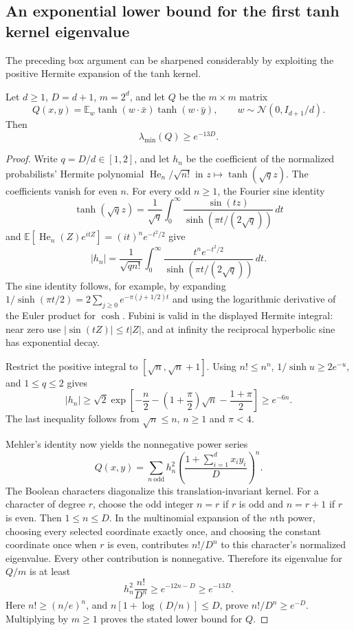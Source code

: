 \subsection{An exponential lower bound for the first tanh kernel eigenvalue}
\label{sec:critical-first-spectrum}

The preceding box argument can be sharpened considerably by exploiting
the positive Hermite expansion of the tanh kernel.

\begin{lemma}
\label{lem:first-tanh-spectrum}
Let $d\ge1$, $D=d+1$, $m=2^d$, and let $Q$ be the $m\times m$ matrix
\[
 Q(x,y)=\mathbb E_w\tanh(w\cdot\bar x)\tanh(w\cdot\bar y),
 \qquad w\sim\mathcal N(0,I_{d+1}/d).
\]
Then
\[
 \lambda_{\min}(Q)\ge e^{-13D}.
\]
\end{lemma}

\begin{proof}
Write $q=D/d\in[1,2]$, and let $h_n$ be the coefficient of the
normalized probabilists' Hermite polynomial $\operatorname{He}_n/\sqrt{n!}$
in $z\mapsto\tanh(\sqrt q z)$. The coefficients vanish for even $n$.
For every odd $n\ge1$, the Fourier sine identity
\[
 \tanh(\sqrt q z)=\frac1{\sqrt q}\int_0^\infty
       \frac{\sin(tz)}{\sinh(\pi t/(2\sqrt q))}\,dt
\]
and $\mathbb E[\operatorname{He}_n(Z)e^{itZ}]=(it)^ne^{-t^2/2}$ give
\[
 |h_n|=\frac1{\sqrt{q n!}}\int_0^\infty
       \frac{t^ne^{-t^2/2}}{\sinh(\pi t/(2\sqrt q))}\,dt.
\]
The sine identity follows, for example, by expanding
$1/\sinh(\pi t/2)=2\sum_{j\ge0}e^{-\pi(j+1/2)t}$ and using the
logarithmic derivative of the Euler product for $\cosh$.
Fubini is valid in the displayed Hermite integral: near zero use
$|\sin(tZ)|\le t|Z|$, and at infinity the reciprocal hyperbolic sine
has exponential decay.

Restrict the positive integral to $[\sqrt n,\sqrt n+1]$.
Using $n!\le n^n$, $1/\sinh u\ge2e^{-u}$, and $1\le q\le2$ gives
\[
 |h_n|\ge\sqrt2\exp\left[-\frac n2
               -\left(1+\frac\pi2\right)\sqrt n
               -\frac{1+\pi}{2}\right]\ge e^{-6n}.
\]
The last inequality follows from $\sqrt n\le n$, $n\ge1$ and $\pi<4$.

Mehler's identity now yields the nonnegative power series
\[
 Q(x,y)=\sum_{n\ \mathrm{odd}}h_n^2
       \left(\frac{1+\sum_{i=1}^d x_i y_i}{D}\right)^n.
\]
The Boolean characters diagonalize this translation-invariant kernel.
For a character of degree $r$, choose the odd integer $n=r$ if $r$
is odd and $n=r+1$ if $r$ is even. Then $1\le n\le D$.
In the multinomial expansion of the $n$th power, choosing every
selected coordinate exactly once, and choosing the constant coordinate
once when $r$ is even, contributes $n!/D^n$ to this character's
normalized eigenvalue. Every other contribution is nonnegative.
Therefore its eigenvalue for $Q/m$ is at least
\[
 h_n^2\frac{n!}{D^n}\ge e^{-12n-D}\ge e^{-13D}.
\]
Here $n!\ge(n/e)^n$, and
$n[1+\log(D/n)]\le D$, prove $n!/D^n\ge e^{-D}$.
Multiplying by $m\ge1$ proves the stated lower bound for $Q$.
\end{proof}

